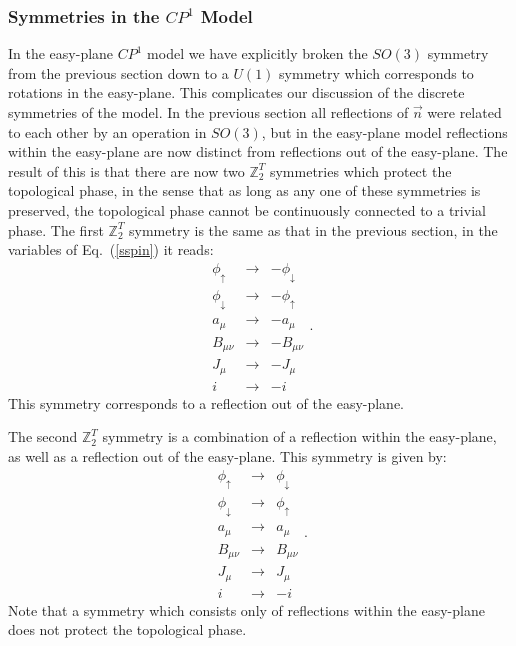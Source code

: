 \documentclass[prb,twocolumn]{revtex4-1}
\def\ztwot{\mathbb{Z}_2^T}
\newcommand{\cp}{$CP^1$ }
\begin{document}
\subsubsection{Symmetries in the \cp Model}
In the easy-plane \cp model we have explicitly broken the $SO(3)$ symmetry from the previous section down to a $U(1)$ symmetry which corresponds to rotations in the easy-plane. 
This complicates our discussion of the discrete symmetries of the model. In the previous section all reflections of $\vec{n}$ were related to each other by an operation in $SO(3)$, but in the easy-plane model reflections within the easy-plane are now distinct from reflections out of the easy-plane. The result of this is that there are now two $\ztwot$ symmetries which protect the topological phase, in the sense that as long as any one of these symmetries is preserved, the topological phase cannot be continuously connected to a trivial phase. 
The first $\ztwot$ symmetry is the same as that in the previous section, in the variables of Eq.~(\ref{sspin}) it reads:
\begin{equation}
\begin{array}{ccc}
 \phi_\uparrow&\rightarrow& -\phi_\downarrow \\
\phi_\downarrow&\rightarrow &-\phi_\uparrow \\
a_\mu&\rightarrow & -a_\mu \\
B_{\mu\nu}&\rightarrow & -B_{\mu\nu}\\
J_\mu &\rightarrow &-J_\mu \\
i & \rightarrow & -i
\end{array}.
\label{z2}
\end{equation}
This symmetry corresponds to a reflection out of the easy-plane.

The second $\ztwot$ symmetry is a combination of a reflection within the easy-plane, as well as a reflection out of the easy-plane. This symmetry is given by:
\begin{equation}
\begin{array}{ccc}
 \phi_\uparrow&\rightarrow& \phi_\downarrow \\
\phi_\downarrow&\rightarrow &\phi_\uparrow \\
a_\mu&\rightarrow & a_\mu \\
B_{\mu\nu}&\rightarrow & B_{\mu\nu}\\
J_\mu &\rightarrow &J_\mu \\
i & \rightarrow & -i
\end{array}.
\label{z22}
\end{equation}
Note that a symmetry which consists only of reflections within the easy-plane does not protect the topological phase. 
\end{document}
